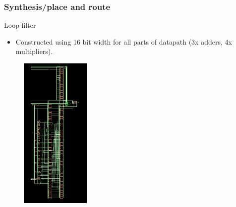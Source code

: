 \documentclass[t, screen, aspectratio=43]{beamer}
\begin{document}
\begin{frame}
	\frametitle{Synthesis/place and route}
	\begin{block}{Loop filter}
	\tiny
	\begin{itemize}[itemsep=4pt,label=\protect---]
		\item Constructed using 16 bit width for all parts of datapath (3x adders, 4x multipliers).
	\end{itemize}
	\begin{figure}[htb!]
	        \centering
	        \includegraphics[width=0.3\textwidth, angle=90]{lf_schem}
	\end{figure}

	\end{block}	
\end{frame}
\end{document}
